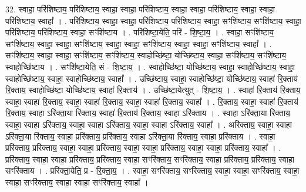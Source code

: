 \documentclass[17pt]{extarticle}
\begin{document}
32. स्वाहा॒ परि॑शिष्टाय॒ परि॑शिष्टाय॒ स्वाहा॒ स्वाहा॒ परि॑शिष्टाय॒ स्वाहा॒ स्वाहा॒ परि॑शिष्टाय॒ स्वाहा॒ स्वाहा॒ परि॑शिष्टाय॒ स्वाहा᳚ । . परि॑शिष्टाय॒ स्वाहा॒ स्वाहा॒ परि॑शिष्टाय॒ परि॑शिष्टाय॒ स्वाहा॒ सꣳशि॑ष्टाय॒ सꣳशि॑ष्टाय॒ स्वाहा॒ परि॑शिष्टाय॒ परि॑शिष्टाय॒ स्वाहा॒ सꣳशि॑ष्टाय । . परि॑शिष्टा॒येति॒ परि॑ - शि॒ष्टा॒य॒ । . स्वाहा॒ सꣳशि॑ष्टाय॒ सꣳशि॑ष्टाय॒ स्वाहा॒ स्वाहा॒ सꣳशि॑ष्टाय॒ स्वाहा॒ स्वाहा॒ सꣳशि॑ष्टाय॒ स्वाहा॒ स्वाहा॒ सꣳशि॑ष्टाय॒ स्वाहा᳚ । . सꣳशि॑ष्टाय॒ स्वाहा॒ स्वाहा॒ सꣳशि॑ष्टाय॒ सꣳशि॑ष्टाय॒ स्वाहोच्छि॑ष्टा॒ योच्छि॑ष्टाय॒ स्वाहा॒ सꣳशि॑ष्टाय॒ सꣳशि॑ष्टाय॒ स्वाहोच्छि॑ष्टाय । . सꣳशि॑ष्टा॒येति॒ सं - शि॒ष्टा॒य॒ । . स्वाहोच्छि॑ष्टा॒ योच्छि॑ष्टाय॒ स्वाहा॒ स्वाहोच्छि॑ष्टाय॒ स्वाहा॒ स्वाहोच्छि॑ष्टाय॒ स्वाहा॒ स्वाहोच्छि॑ष्टाय॒ स्वाहा᳚ । . उच्छि॑ष्टाय॒ स्वाहा॒ स्वाहोच्छि॑ष्टा॒ योच्छि॑ष्टाय॒ स्वाहा॑ रि॒क्ताय॑ रि॒क्ताय॒ स्वाहोच्छि॑ष्टा॒ योच्छि॑ष्टाय॒ स्वाहा॑ रि॒क्ताय॑ । . उच्छि॑ष्टा॒येत्युत् - शि॒ष्टा॒य॒ । . स्वाहा॑ रि॒क्ताय॑ रि॒क्ताय॒ स्वाहा॒ स्वाहा॑ रि॒क्ताय॒ स्वाहा॒ स्वाहा॑ रि॒क्ताय॒ स्वाहा॒ स्वाहा॑ रि॒क्ताय॒ स्वाहा᳚ । . रि॒क्ताय॒ स्वाहा॒ स्वाहा॑ रि॒क्ताय॑ रि॒क्ताय॒ स्वाहा ऽरि॑क्ता॒या रि॑क्ताय॒ स्वाहा॑ रि॒क्ताय॑ रि॒क्ताय॒ स्वाहा ऽरि॑क्ताय । . स्वाहा ऽरि॑क्ता॒या रि॑क्ताय॒ स्वाहा॒ स्वाहा ऽरि॑क्ताय॒ स्वाहा॒ स्वाहा ऽरि॑क्ताय॒ स्वाहा॒ स्वाहा ऽरि॑क्ताय॒ स्वाहा᳚ । . अरि॑क्ताय॒ स्वाहा॒ स्वाहा ऽरि॑क्ता॒या रि॑क्ताय॒ स्वाहा॒ प्ररि॑क्ताय॒ प्ररि॑क्ताय॒ स्वाहा ऽरि॑क्ता॒या रि॑क्ताय॒ स्वाहा॒ प्ररि॑क्ताय । . स्वाहा॒ प्ररि॑क्ताय॒ प्ररि॑क्ताय॒ स्वाहा॒ स्वाहा॒ प्ररि॑क्ताय॒ स्वाहा॒ स्वाहा॒ प्ररि॑क्ताय॒ स्वाहा॒ स्वाहा॒ प्ररि॑क्ताय॒ स्वाहा᳚ । . प्ररि॑क्ताय॒ स्वाहा॒ स्वाहा॒ प्ररि॑क्ताय॒ प्ररि॑क्ताय॒ स्वाहा॒ सꣳरि॑क्ताय॒ सꣳरि॑क्ताय॒ स्वाहा॒ प्ररि॑क्ताय॒ प्ररि॑क्ताय॒ स्वाहा॒ सꣳरि॑क्ताय । . प्ररि॑क्ता॒येति॒ प्र - रि॒क्ता॒य॒ । . स्वाहा॒ सꣳरि॑क्ताय॒ सꣳरि॑क्ताय॒ स्वाहा॒ स्वाहा॒ सꣳरि॑क्ताय॒ स्वाहा॒ स्वाहा॒ सꣳरि॑क्ताय॒ स्वाहा॒ स्वाहा॒ सꣳरि॑क्ताय॒ स्वाहा᳚ । \newline
\end{document}
